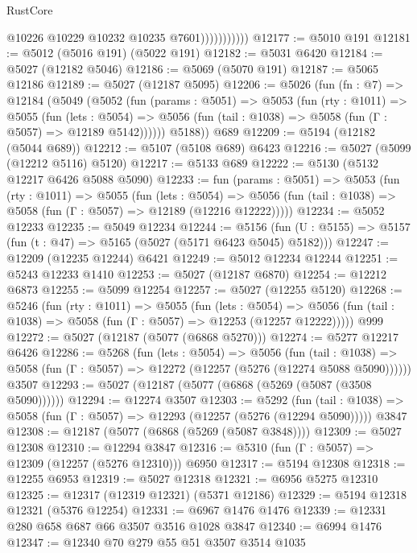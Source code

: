 \begin{lexlean}{RustCore}
\begin{coremodule}
                          @10226
                          @10229
                          @10232
                          @10235
                          @7601)))))))))))
@12177 := @5010 @191
@12181 := @5012 (@5016 @191) (@5022 @191)
@12182 := @5031 @6420
@12184 := @5027 (@12182 @5046)
@12186 := @5069 (@5070 @191)
@12187 := @5065 @12186
@12189 := @5027 (@12187 @5095)
@12206 := @5026
    (fun (fn : @7) =>
    @12184
      (@5049
        (@5052
          (fun (params : @5051) =>
          @5053
            (fun (rty : @1011) =>
            @5055
              (fun (lets : @5054) =>
              @5056 (fun (tail : @1038) => @5058 (fun (Γ : @5057) => @12189 @5142))))))
        @5188))
    @689
@12209 := @5194 (@12182 (@5044 @689))
@12212 := @5107 (@5108 @689) @6423
@12216 := @5027 (@5099 (@12212 @5116) @5120)
@12217 := @5133 @689
@12222 := @5130 (@5132 @12217 @6426 @5088 @5090)
@12233 := fun (params : @5051) =>
  @5053
    (fun (rty : @1011) =>
    @5055
      (fun (lets : @5054) =>
      @5056 (fun (tail : @1038) => @5058 (fun (Γ : @5057) => @12189 (@12216 @12222)))))
@12234 := @5052 @12233
@12235 := @5049 @12234
@12244 := @5156
    (fun (U : @5155) => @5157 (fun (t : @47) => @5165 (@5027 (@5171 @6423 @5045) @5182)))
@12247 := @12209 (@12235 @12244) @6421
@12249 := @5012 @12234 @12244
@12251 := @5243 @12233 @1410
@12253 := @5027 (@12187 @6870)
@12254 := @12212 @6873
@12255 := @5099 @12254
@12257 := @5027 (@12255 @5120)
@12268 := @5246
    (fun (rty : @1011) =>
    @5055
      (fun (lets : @5054) =>
      @5056 (fun (tail : @1038) => @5058 (fun (Γ : @5057) => @12253 (@12257 @12222)))))
    @999
@12272 := @5027 (@12187 (@5077 (@6868 @5270)))
@12274 := @5277 @12217 @6426
@12286 := @5268
    (fun (lets : @5054) =>
    @5056
      (fun (tail : @1038) =>
      @5058 (fun (Γ : @5057) => @12272 (@12257 (@5276 (@12274 @5088 @5090))))))
    @3507
@12293 := @5027 (@12187 (@5077 (@6868 (@5269 (@5087 (@3508 @5090))))))
@12294 := @12274 @3507
@12303 := @5292
    (fun (tail : @1038) => @5058 (fun (Γ : @5057) => @12293 (@12257 (@5276 (@12294 @5090)))))
    @3847
@12308 := @12187 (@5077 (@6868 (@5269 (@5087 @3848))))
@12309 := @5027 @12308
@12310 := @12294 @3847
@12316 := @5310 (fun (Γ : @5057) => @12309 (@12257 (@5276 @12310))) @6950
@12317 := @5194 @12308
@12318 := @12255 @6953
@12319 := @5027 @12318
@12321 := @6956 @5275 @12310
@12325 := @12317 (@12319 @12321) (@5371 @12186)
@12329 := @5194 @12318 @12321 (@5376 @12254)
@12331 := @6967 @1476 @1476
@12339 := @12331 @280 @658 @687 @66 @3507 @3516 @1028 @3847
@12340 := @6994 @1476
@12347 := @12340 @70 @279 @55 @51 @3507 @3514 @1035

\end{coremodule}
\end{lexlean}
